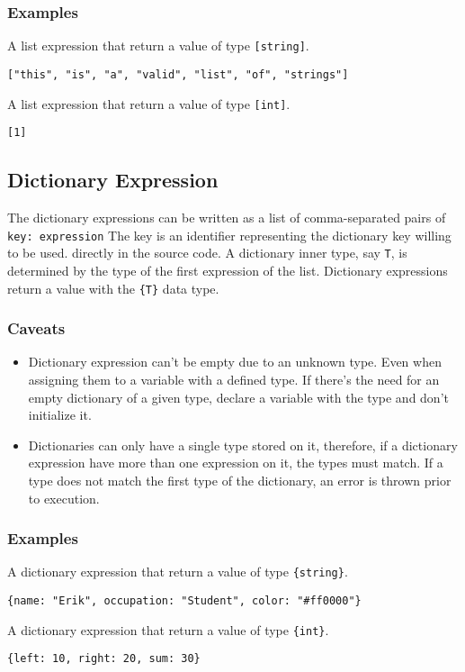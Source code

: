 \subsubsection{Examples}

A list expression that return a value of type \texttt{[string]}.
\begin{lstlisting}
["this", "is", "a", "valid", "list", "of", "strings"]
\end{lstlisting}
A list expression that return a value of type \texttt{[int]}.
\begin{lstlisting}
[1]
\end{lstlisting}

\subsection{Dictionary Expression}

The dictionary expressions can be written as a list of comma-separated pairs of \texttt{key: expression}
The key is an identifier representing the dictionary key willing to be used.
directly in the source code. A dictionary inner type, say \texttt{T}, is determined by the type of the first expression of the list.
Dictionary expressions return a value with the \texttt{\{T\}} data type.

\subsubsection{Caveats}

\begin{itemize}
    \item Dictionary expression can't be empty due to an unknown type. Even when assigning them to a variable with a defined type. If there's the
        need for an empty dictionary of a given type, declare a variable with the type and don't initialize it.
    \item Dictionaries can only have a single type stored on it, therefore, if a dictionary expression have more than one expression on it, the types
        must match. If a type does not match the first type of the dictionary, an error is thrown prior to execution.
\end{itemize}

\subsubsection{Examples}

A dictionary expression that return a value of type \texttt{\{string\}}.
\begin{lstlisting}
{name: "Erik", occupation: "Student", color: "#ff0000"}
\end{lstlisting}
A dictionary expression that return a value of type \texttt{\{int\}}.
\begin{lstlisting}
{left: 10, right: 20, sum: 30}
\end{lstlisting}

